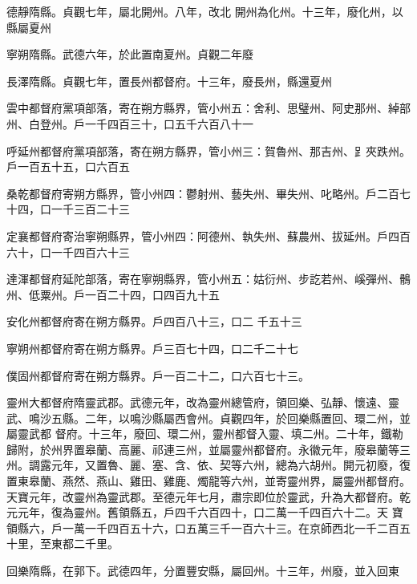 \begin{pinyinscope}
 德靜隋縣。貞觀七年，屬北開州。八年，改北
 開州為化州。十三年，廢化州，以縣屬夏州



 寧朔隋縣。武德六年，於此置南夏州。貞觀二年廢



 長澤隋縣。貞觀七年，置長州都督府。十三年，廢長州，縣還夏州



 雲中都督府黨項部落，寄在朔方縣界，管小州五：舍利、思璧州、阿史那州、綽部州、白登州。戶一千四百三十，口五千六百八十一



 呼延州都督府黨項部落，寄在朔方縣界，管小州三：賀魯州、那吉州、𧾷夾跌州。戶一百五十五，口六百五



 桑乾都督府寄朔方縣界，管小州四：鬱射州、藝失州、畢失州、叱略州。戶二百七十四，口一千三百二十三



 定襄都督府寄治寧朔縣界，管小州四：阿德州、執失州、蘇農州、拔延州。戶四百六十，口一千四百六十三



 達渾都督府延陀部落，寄在寧朔縣界，管小州五：姑衍州、步訖若州、嵠彈州、鶻州、低粟州。戶一百二十四，口四百九十五



 安化州都督府寄在朔方縣界。戶四百八十三，口二
 千五十三



 寧朔州都督府寄在朔方縣界。戶三百七十四，口二千二十七



 僕固州都督府寄在朔方縣界。戶一百二十二，口六百七十三。



 靈州大都督府隋靈武郡。武德元年，改為靈州總管府，領回樂、弘靜、懷遠、靈武、鳴沙五縣。二年，以鳴沙縣屬西會州。貞觀四年，於回樂縣置回、環二州，並屬靈武都
 督府。十三年，廢回、環二州，靈州都督入靈、填二州。二十年，鐵勒歸附，於州界置皋蘭、高麗、祁連三州，並屬靈州都督府。永徽元年，廢皋蘭等三州。調露元年，又置魯、麗、塞、含、依、契等六州，總為六胡州。開元初廢，復置東皋蘭、燕然、燕山、雞田、雞鹿、燭龍等六州，並寄靈州界，屬靈州都督府。天寶元年，改靈州為靈武郡。至德元年七月，肅宗即位於靈武，升為大都督府。乾元元年，復為靈州。舊領縣五，戶四千六百四十，口二萬一千四百六十二。天
 寶領縣六，戶一萬一千四百五十六，口五萬三千一百六十三。在京師西北一千二百五十里，至東都二千里。



 回樂隋縣，在郭下。武德四年，分置豐安縣，屬回州。十三年，州廢，並入回東




\end{pinyinscope}
